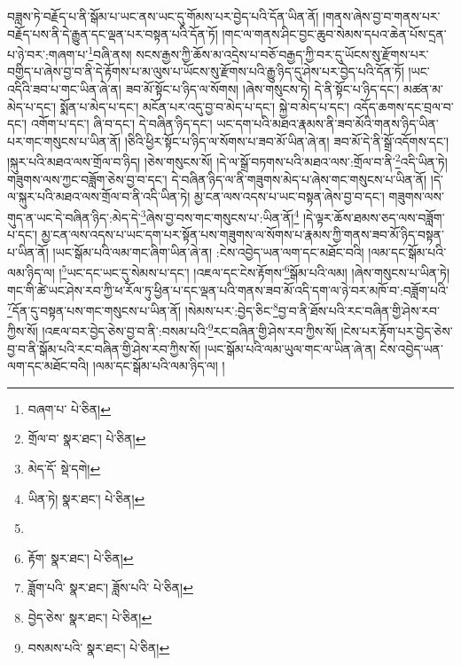 བཟླས་ཏེ་བརྗོད་པ་ནི་སྒོམ་པ་ཡང་ནས་ཡང་དུ་གོམས་པར་བྱེད་པའི་དོན་ཡིན་ནོ། །གནས་ཞེས་བྱ་བ་གནས་པར་བརྗོད་པས་ནི་དེ་རྒྱུན་དང་ལྡན་པར་བསྟན་པའི་དོན་ཏོ། །གང་ལ་གནས་ཤིང་བྱང་ཆུབ་སེམས་དཔའ་ཆེན་པོས་དྲན་པ་ཉེ་བར་:གཞག་པ་\footnote{བཞག་པ་  པེ་ཅིན། }བཞི་ནས། སངས་རྒྱས་ཀྱི་ཆོས་མ་འདྲེས་པ་བཅོ་བརྒྱད་ཀྱི་བར་དུ་ཡོངས་སུ་རྫོགས་པར་བགྱིད་པ་ཞེས་བྱ་བ་ནི་དེ་རྟོགས་པ་མ་ལུས་པ་ཡོངས་སུ་རྫོགས་པའི་རྒྱུ་ཉིད་དུ་ཤེས་པར་བྱེད་པའི་དོན་ཏོ། །ཡང་འདིའི་ཟབ་པ་གང་ཡིན་ཞེ་ན། ཟབ་མོ་སྟོང་པ་ཉིད་ལ་སོགས། །ཞེས་གསུངས་ཏེ། དེ་ནི་སྟོང་པ་ཉིད་དང་། མཚན་མ་མེད་པ་དང་། སྨོན་པ་མེད་པ་དང་། མངོན་པར་འདུ་བྱ་བ་མེད་པ་དང་། སྐྱེ་བ་མེད་པ་དང་། འདོད་ཆགས་དང་བྲལ་བ་དང་། འགོག་པ་དང་། ཞི་བ་དང་། དེ་བཞིན་ཉིད་དང་། ཡང་དག་པའི་མཐའ་རྣམས་ནི་ཟབ་མོའི་གནས་ཉིད་ཡིན་པར་གང་གསུངས་པ་ཡིན་ནོ། །ཅིའི་ཕྱིར་སྟོང་པ་ཉིད་ལ་སོགས་པ་ཟབ་མོ་ཡིན་ཞེ་ན། ཟབ་མོ་དེ་ནི་སྒྲོ་འདོགས་དང་། །སྐུར་པའི་མཐའ་ལས་གྲོལ་བ་ཉིད། །ཅེས་གསུངས་སོ། །དེ་ལ་སྒྲོ་བཏགས་པའི་མཐའ་ལས་:གྲོལ་བ་ནི་\footnote{གྲོལ་བ་  སྣར་ཐང་།  པེ་ཅིན། }འདི་ཡིན་ཏེ། གཟུགས་ལས་ཀྱང་བཟློག་ཅེས་བྱ་བ་དང་། དེ་བཞིན་ཉིད་ལ་ནི་གཟུགས་མེད་པ་ཞེས་གང་གསུངས་པ་ཡིན་ནོ། །དེ་ལ་སྐུར་པའི་མཐའ་ལས་གྲོལ་བ་ནི་འདི་ཡིན་ཏེ། མྱ་ངན་ལས་འདས་པ་ཡང་བསྟན་ཞེས་བྱ་བ་དང་། གཟུགས་ལས་གུད་ན་ཡང་དེ་བཞིན་ཉིད་:མེད་དེ་\footnote{མེད་དོ་  སྡེ་དགེ། }ཞེས་བྱ་བས་གང་གསུངས་པ་:ཡིན་ནོ།\footnote{ཡིན་ཏེ།  སྣར་ཐང་།  པེ་ཅིན། } །དེ་ལྟར་ཆོས་ཐམས་ཅད་ལས་བཟློག་པ་དང་། མྱ་ངན་ལས་འདས་པ་ཡང་དག་པར་སྟོན་པས་གཟུགས་ལ་སོགས་པ་རྣམས་ཀྱི་གནས་ཟབ་མོ་ཉིད་བསྟན་པ་ཡིན་ནོ། །ཡང་སྒོམ་པའི་ལམ་གང་ཞིག་ཡིན་ཞེ་ན། :ངེས་འབྱེད་ཡན་ལག་དང་མཐོང་བའི། །ལམ་དང་སྒོམ་པའི་ལམ་ཉིད་ལ། །\footnote{}ཡང་དང་ཡང་དུ་སེམས་པ་དང་། །འཇལ་དང་ངེས་རྟོགས་\footnote{རྟོག་  སྣར་ཐང་།  པེ་ཅིན། }སྒོམ་པའི་ལམ། །ཞེས་གསུངས་པ་ཡིན་ཏེ། གང་གི་ཚེ་ཡང་ཤེས་རབ་ཀྱི་ཕ་རོལ་ཏུ་ཕྱིན་པ་དང་ལྡན་པའི་གནས་ཟབ་མོ་འདི་དག་ལ་ཉེ་བར་མཁོ་བ་:བཟློག་པའི་\footnote{ཟློག་པའི་  སྣར་ཐང་། ཟློས་པའི་  པེ་ཅིན། }དོན་དུ་བསྟན་པས་གང་གསུངས་པ་ཡིན་ནོ། །སེམས་པར་:བྱེད་ཅིང་\footnote{བྱེད་ཅེས་  སྣར་ཐང་།  པེ་ཅིན། }བྱ་བ་ནི་ཐོས་པའི་རང་བཞིན་གྱི་ཤེས་རབ་ཀྱིས་སོ། །འཇལ་བར་བྱེད་ཅེས་བྱ་བ་ནི་:བསམ་པའི་\footnote{བསམས་པའི་  སྣར་ཐང་།  པེ་ཅིན། }རང་བཞིན་གྱི་ཤེས་རབ་ཀྱིས་སོ། །ངེས་པར་རྟོག་པར་བྱེད་ཅེས་བྱ་བ་ནི་སྒོམ་པའི་རང་བཞིན་གྱི་ཤེས་རབ་ཀྱིས་སོ། །ཡང་སྒོམ་པའི་ལམ་ཡུལ་གང་ལ་ཡིན་ཞེ་ན། ངེས་འབྱེད་ཡན་ལག་དང་མཐོང་བའི། །ལམ་དང་སྒོམ་པའི་ལམ་ཉིད་ལ། །
